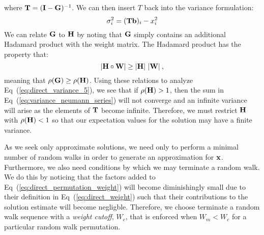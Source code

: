 where $\mathbf{T} = (\mathbf{I}-\mathbf{G})^{-1}$. We can then insert $T$ back
into the variance formulation:
\begin{equation}
  \sigma^2_i = (\mathbf{T}\mathbf{b})_i - x_i^2
  \label{eq:direct_variance_5}
\end{equation}
We can relate $\mathbf{G}$ to $\mathbf{H}$ by noting that $\mathbf{G}$ simply
contains an additional Hadamard product with the weight matrix. The
Hadamard product has the property that:
\begin{equation}
  |\mathbf{H} \circ \mathbf{W}| \geq |\mathbf{H}|\ |\mathbf{W}|\:,
  \label{eq:hadamard_inequality}
\end{equation}
meaning that $\rho(\mathbf{G}) \geq \rho(\mathbf{H})$. Using these relations
to analyze Eq~(\ref{eq:direct_variance_5}), we see that if
$\rho(\mathbf{H}) > 1$, then the sum in
Eq~(\ref{eq:variance_neumann_series}) will not converge and an
infinite variance will arise as the elements of $\mathbf{T}$ become
infinite. Therefore, we must restrict $\mathbf{H}$ with $\rho(\mathbf{H}) < 1$
so that our expectation values for the solution may have a finite
variance.

As we seek only approximate solutions, we need only to perform a
minimal number of random walks in order to generate an approximation
for $\mathbf{x}$. Furthermore, we also need conditions by which we may
terminate a random walk. We do this by noticing that the factors added
to Eq~(\ref{eq:direct_permutation_weight}) will become diminishingly
small due to their definition in Eq~(\ref{eq:direct_weight}) such that
their contributions to the solution estimate will become
negligble. Therefore, we choose terminate a random walk sequence with
a \textit{weight cutoff}, $W_c$, that is enforced when $W_m < W_c$ for
a particular random walk permutation.

